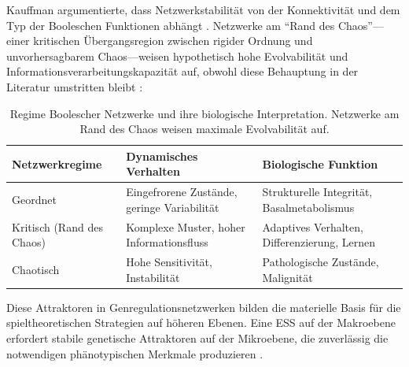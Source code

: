 \documentclass[12pt,a4paper]{article}
\theoremstyle{remark}
\begin{document}
Kauffman argumentierte, dass Netzwerkstabilit\"at von der Konnektivit\"at und dem Typ der Booleschen Funktionen abh\"angt \citep{BooleanPost}. Netzwerke am ``Rand des Chaos''---einer kritischen \"Ubergangsregion zwischen rigider Ordnung und unvorhersagbarem Chaos---weisen hypothetisch hohe Evolvabilit\"at und Informationsverarbeitungskapazit\"at auf, obwohl diese Behauptung in der Literatur umstritten bleibt \citep{KauffmanOrigins}:

\begin{table}[htbp]
\centering
\caption{Regime Boolescher Netzwerke und ihre biologische Interpretation. Netzwerke am Rand des Chaos weisen maximale Evolvabilit\"at auf.}
\label{tab:network-regimes}
\begin{tabular}{lll}
\toprule
\textbf{Netzwerkregime} & \textbf{Dynamisches Verhalten} & \textbf{Biologische Funktion} \\
\midrule
Geordnet & Eingefrorene Zust\"ande, geringe Variabilit\"at & Strukturelle Integrit\"at, Basalmetabolismus \\
Kritisch (Rand des Chaos) & Komplexe Muster, hoher Informationsfluss & Adaptives Verhalten, Differenzierung, Lernen \\
Chaotisch & Hohe Sensitivit\"at, Instabilit\"at & Pathologische Zust\"ande, Malignit\"at \\
\bottomrule
\end{tabular}
\end{table}

Diese Attraktoren in Genregulationsnetzwerken bilden die materielle Basis f\"ur die spieltheoretischen Strategien auf h\"oheren Ebenen. Eine ESS auf der Makroebene erfordert stabile genetische Attraktoren auf der Mikroebene, die zuverl\"assig die notwendigen ph\"anotypischen Merkmale produzieren \citep{BooleanMicroarray,KauffmanOrigins}.
\end{document}

